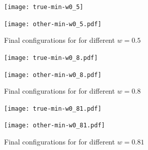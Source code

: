 \documentclass[11pt]{article} %
\begin{document}
\begin{figure}
\begin{minipage}[b]{0.5\linewidth}
\centering
\texttt{[image: true-min-w0\_5]}

\label{fig:Finalconfig-MultMin-w-0_5_a}

\end{minipage}
\hspace{0.5cm}
\begin{minipage}[b]{0.5\linewidth}
\centering
\texttt{[image: other-min-w0\_5.pdf]}

\label{fig:Finalconfig-MultMin-w-0_5_b}

\end{minipage}

\caption{Final configurations for for different $w=0.5$ }
\label{fig:Finalconfig-MultMin-w-0_5}

\end{figure}

\begin{figure}
\begin{minipage}[b]{0.5\linewidth}
\centering
\texttt{[image: true-min-w0\_8.pdf]}
\label{fig:Finalconfig-MultMin-w-0_8_a}


\end{minipage}
\hspace{0.5cm}
\begin{minipage}[b]{0.5\linewidth}
\centering
\texttt{[image: other-min-w0\_8.pdf]}
\label{fig:Finalconfig-MultMin-w-0_8_a}


\end{minipage}

\caption{Final configurations for for different $w=0.8$ }
\label{fig:Finalconfig-MultMin-w-0_8}

\end{figure}



\begin{figure}
\begin{minipage}[b]{0.5\linewidth}
\centering
\texttt{[image: true-min-w0\_81.pdf]}


\end{minipage}
\hspace{0.5cm}
\begin{minipage}[b]{0.5\linewidth}
\centering
\texttt{[image: other-min-w0\_81.pdf]}


\end{minipage}

\caption{Final configurations for for different $w=0.81$ }
\label{fig:Finalconfig-MultMin-w-0_81}

\end{figure}
\end{document}
